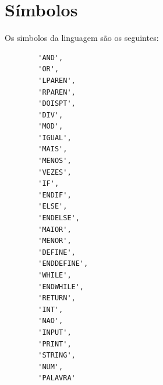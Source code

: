\documentclass[11pt,a4paper]{report}
\begin{document}
    \section{Símbolos}
    Os simbolos da linguagem são os seguintes:
    \begin{verbatim}
        'AND',
        'OR',
        'LPAREN',
        'RPAREN',
        'DOISPT',
        'DIV',
        'MOD',
        'IGUAL',
        'MAIS',
        'MENOS',
        'VEZES',
        'IF',
        'ENDIF',
        'ELSE',
        'ENDELSE',
        'MAIOR',
        'MENOR',
        'DEFINE',
        'ENDDEFINE',
        'WHILE',
        'ENDWHILE',
        'RETURN',
        'INT',
        'NAO',
        'INPUT',
        'PRINT',
        'STRING',
        'NUM',
        'PALAVRA'
    \end{verbatim}
\end{document}
